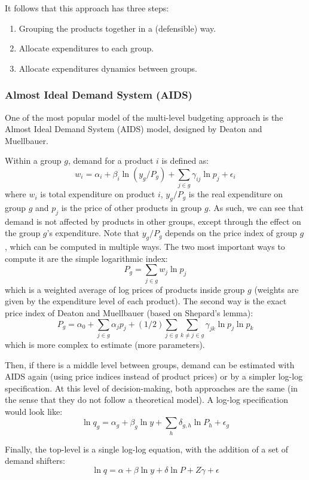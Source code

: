 It follows that this approach has three steps: \begin{enumerate}
\item Grouping the products together in a (defensible) way.
\item Allocate expenditures to each group.
\item Allocate expenditures dynamics between groups.
\end{enumerate}

\subsubsection{Almost Ideal Demand System (AIDS)}

One of the most popular model of the multi-level budgeting approach is the Almost Ideal Demand System (AIDS) model, designed by Deaton and Muellbauer.

Within a group $g$, demand for a product $i$ is defined as: $$ w_i = \alpha_i + \beta_i \ln(y_g/P_g) + \sum_{j\in g} \gamma_{ij} \ln p_j + \epsilon_i $$ where $w_i$ is total expenditure on product $i$, $y_g/P_g$ is the real expenditure on group $g$ and $p_j$ is the price of other products in group $g$. As such, we can see that demand is not affected by products in other groups, except through the effect on the group $g$'s expenditure. Note that $y_g/P_g$ depends on the price index of group $g$, which can be computed in multiple ways. The two most important ways to compute it are the simple logarithmic index: $$ P_g = \sum_{j\in g} w_j \ln p_j $$ which is a weighted average of log prices of products inside group $g$ (weights are given by the expenditure level of each product). The second way is the exact price index of Deaton and Muellbauer (based on Shepard's lemma): $$ P_g = \alpha_0 + \sum_{j\in g} \alpha_j p_j + (1/2) \sum_{j\in g}\sum_{k\neq j\in g} \gamma_{jk} \ln p_j \ln p_k $$ which is more complex to estimate (more parameters).

Then, if there is a middle level between groups, demand can be estimated with AIDS again (using price indices instead of product prices) or by a simpler log-log specification. At this level of decision-making, both approaches are the same (in the sense that they do not follow a theoretical model). A log-log specification would look like: $$ \ln q_g = \alpha_g + \beta_g \ln y + \sum_{h} \delta_{g,h } \ln P_h + \epsilon_g $$

Finally, the top-level is a single log-log equation, with the addition of a set of demand shifters: $$ \ln q = \alpha  + \beta \ln y + \delta \ln P + Z \gamma + \epsilon $$

